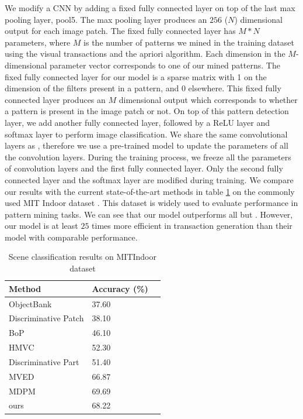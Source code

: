 \documentclass[10pt,twocolumn,letterpaper]{article}
\begin{document}
{We modify a CNN \cite{Alexnet} by adding a fixed fully connected layer on top of the last max pooling layer, pool5.
The max pooling layer produces an $256$ ($N$) dimensional output for each image patch.
The fixed fully connected layer has $M*N$ parameters, where $M$ is the number of patterns we mined in the training dataset using the visual transactions and the apriori algorithm.
Each dimension in the $M$-dimensional parameter vector corresponds to one of our mined patterns.
The fixed fully connected layer for our model is a sparse matrix with 1 on the dimension of the filters present in a pattern, and 0 elsewhere.
This fixed fully connected layer produces an $M$ dimensional output which corresponds to whether a pattern is present in the image patch or not.
On top of this pattern detection layer, we add another fully connected layer, followed by a ReLU layer and softmax layer to perform image classification.
We share the same convolutional layers as \cite{Alexnet}, therefore we use a pre-trained model to update the parameters of all the convolution layers.
During the training process, we freeze all the parameters of convolution layers and the first fully connected layer.
Only the second fully connected layer and the softmax layer are modified during training.
We compare our results with the current state-of-the-art methods in table \ref{tab:MITIndoor} on the commonly used MIT Indoor dataset \cite{10.1109/CVPRW.2009.5206537}.
This dataset is widely used to evaluate performance in pattern mining tasks.
We can see that our model outperforms all but \cite{LiLSH15CVPR}.
However, our model is at least $25$ times more efficient in transaction generation than their model with comparable performance.

\begin{table}
\centering
\caption{Scene classification results on MITIndoor dataset}
\begin{tabular}{lll}
\hline
\hline
Method                       & Accuracy (\%)           \\ \hline
ObjectBank \cite{li2010object}                                  & 37.60                  \\
Discriminative Patch \cite{singh2012unsupervised}                     & 38.10                  \\
BoP \cite{juneja2013blocks}                                & 46.10                  \\
HMVC \cite{li2013harvesting}                                  & 52.30                 \\
Discriminative Part \cite{sun2013learning}                 & 51.40                  \\
MVED \cite{doersch2013mid}                  & 66.87                  \\
MDPM \cite{LiLSH15CVPR}                                     & 69.69                  \\
ours                                      &  68.22        \\ \hline
\end{tabular}
\label{tab:MITIndoor}
\end{table}

}
\end{document}
